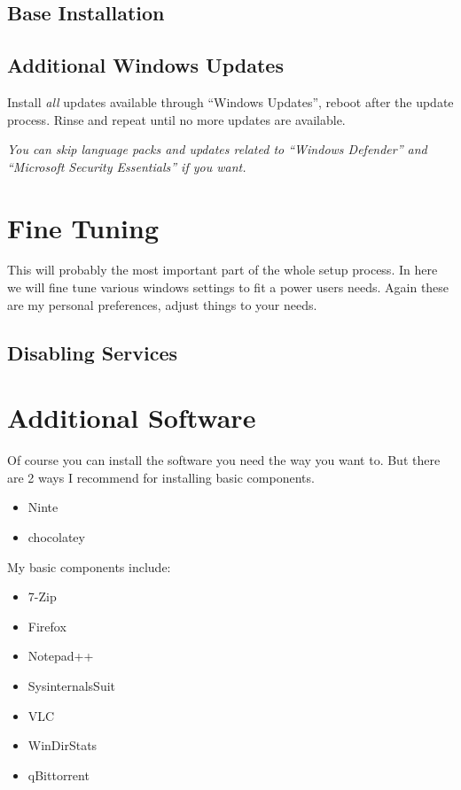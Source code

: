\documentclass{itsarticle}
\begin{document}
\subsection{Base Installation}
\label{ssec:base_install}

\subsection{Additional Windows Updates}
\label{ssec:updates_post_install}

Install \emph{all} updates available through ``Windows Updates'', reboot after
the update process. Rinse and repeat until no more updates are available.

\textit{You can skip language packs and updates related to ``Windows Defender''
and ``Microsoft Security Essentials'' if you want.}

\section{Fine Tuning}
\label{sec:fine_tuning}

This will probably the most important part of the whole setup process. In here
we will fine tune various windows settings to fit a power users needs. Again
these are my personal preferences, adjust things to your needs.

\subsection{Disabling Services}
\label{ssec:services}

\section{Additional Software}
\label{sec:software}

Of course you can install the software you need the way you want to. But there
are 2 ways I recommend for installing basic components.

\begin{itemize}
    \item Ninte\footnotemark
    \item chocolatey\footnotemark
\end{itemize}


My basic components include:

\begin{itemize}
    \item 7-Zip
    \item Firefox
    \item Notepad++
    \item SysinternalsSuit
    \item VLC
    \item WinDirStats
    \item qBittorrent
\end{itemize}
\end{document}
